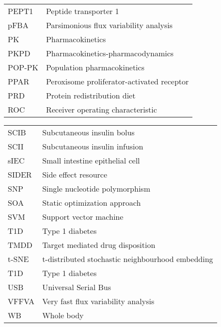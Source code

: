 \begin{table}[h]
\begin{tabular}{l l}
	PEPT1 & Peptide transporter 1\\
	pFBA & Parsimonious flux variability analysis\\
	PK & Pharmacokinetics \\
	PKPD & Pharmacokinetics-pharmacodynamics \\
	POP-PK & Population pharmacokinetics\\
	PPAR & Peroxisome proliferator-activated receptor\\
	PRD & Protein redistribution diet\\
	ROC & Receiver operating characteristic\\
	\end{tabular}
\end{table}	
\clearpage
\begin{table}[h]
	\begin{tabular}{l l}
	SCIB & Subcutaneous insulin bolus\\
	SCII & Subcutaneous insulin infusion\\
	sIEC & Small intestine epithelial cell\\
	SIDER & Side effect resource\\
	SNP & Single nucleotide polymorphism\\
	SOA & Static optimization approach\\
	SVM & Support vector machine\\
	T1D & Type 1 diabetes\\
	TMDD & Target mediated drug disposition \\
	t-SNE & t-distributed stochastic neighbourhood embedding\\
	T1D & Type 1 diabetes\\
	USB & Universal Serial Bus\\
	VFFVA & Very fast flux variability analysis\\
	WB & Whole body\\
	\end{tabular}
\end{table}	
